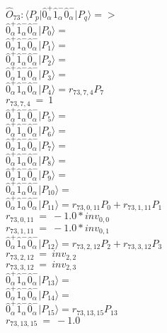 \documentclass[14pt]{article}
\begin{document}
    $\hat{O}_{73}:  \langle{P_p}\vert \hat{0}_{\alpha}^{+}\hat{1}_{\alpha}^{-}\hat{0}_{\alpha}^{-} \vert{P_q}\rangle => $ \\ 
    $ \hat{0}_{\alpha}^{+}\hat{1}_{\alpha}^{-}\hat{0}_{\alpha}^{-} \vert{P_{0}}\rangle =  $ \\ 
    $ \hat{0}_{\alpha}^{+}\hat{1}_{\alpha}^{-}\hat{0}_{\alpha}^{-} \vert{P_{1}}\rangle =  $ \\ 
    $ \hat{0}_{\alpha}^{+}\hat{1}_{\alpha}^{-}\hat{0}_{\alpha}^{-} \vert{P_{2}}\rangle =  $ \\ 
    $ \hat{0}_{\alpha}^{+}\hat{1}_{\alpha}^{-}\hat{0}_{\alpha}^{-} \vert{P_{3}}\rangle =  $ \\ 
    $ \hat{0}_{\alpha}^{+}\hat{1}_{\alpha}^{-}\hat{0}_{\alpha}^{-} \vert{P_{4}}\rangle = {r}_{73,7,4}P_{7} $ \\ 
    ${r}_{73,7,4}\ =\ 1 $ \\ 
    $ \hat{0}_{\alpha}^{+}\hat{1}_{\alpha}^{-}\hat{0}_{\alpha}^{-} \vert{P_{5}}\rangle =  $ \\ 
    $ \hat{0}_{\alpha}^{+}\hat{1}_{\alpha}^{-}\hat{0}_{\alpha}^{-} \vert{P_{6}}\rangle =  $ \\ 
    $ \hat{0}_{\alpha}^{+}\hat{1}_{\alpha}^{-}\hat{0}_{\alpha}^{-} \vert{P_{7}}\rangle =  $ \\ 
    $ \hat{0}_{\alpha}^{+}\hat{1}_{\alpha}^{-}\hat{0}_{\alpha}^{-} \vert{P_{8}}\rangle =  $ \\ 
    $ \hat{0}_{\alpha}^{+}\hat{1}_{\alpha}^{-}\hat{0}_{\alpha}^{-} \vert{P_{9}}\rangle =  $ \\ 
    $ \hat{0}_{\alpha}^{+}\hat{1}_{\alpha}^{-}\hat{0}_{\alpha}^{-} \vert{P_{10}}\rangle =  $ \\ 
    $ \hat{0}_{\alpha}^{+}\hat{1}_{\alpha}^{-}\hat{0}_{\alpha}^{-} \vert{P_{11}}\rangle = {r}_{73,0,11}P_{0}+{r}_{73,1,11}P_{1} $ \\ 
    ${r}_{73,0,11}\ =\ -1.0*{inv}_{0,0} $ \\ 
    ${r}_{73,1,11}\ =\ -1.0*{inv}_{0,1} $ \\ 
    $ \hat{0}_{\alpha}^{+}\hat{1}_{\alpha}^{-}\hat{0}_{\alpha}^{-} \vert{P_{12}}\rangle = {r}_{73,2,12}P_{2}+{r}_{73,3,12}P_{3} $ \\ 
    ${r}_{73,2,12}\ =\ {inv}_{2,2} $ \\ 
    ${r}_{73,3,12}\ =\ {inv}_{2,3} $ \\ 
    $ \hat{0}_{\alpha}^{+}\hat{1}_{\alpha}^{-}\hat{0}_{\alpha}^{-} \vert{P_{13}}\rangle =  $ \\ 
    $ \hat{0}_{\alpha}^{+}\hat{1}_{\alpha}^{-}\hat{0}_{\alpha}^{-} \vert{P_{14}}\rangle =  $ \\ 
    $ \hat{0}_{\alpha}^{+}\hat{1}_{\alpha}^{-}\hat{0}_{\alpha}^{-} \vert{P_{15}}\rangle = {r}_{73,13,15}P_{13} $ \\ 
    ${r}_{73,13,15}\ =\ -1.0 $ \\ 
    
\end{document}
